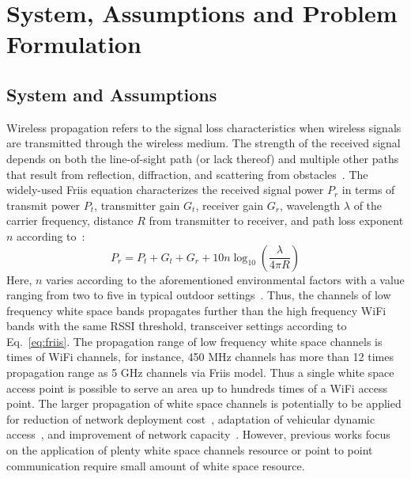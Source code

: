 \section{System, Assumptions and Problem Formulation}
\label{sec:problemformulation}

\subsection{System and Assumptions}
\label{subsec:model}
Wireless propagation refers to the signal loss characteristics when wireless signals 
are transmitted through the wireless medium. The strength of the received signal depends on 
both the line-of-sight path (or lack thereof) and multiple other paths that result from reflection, 
diffraction, and scattering from obstacles~\cite{andersen1995propagation}. The widely-used Friis
equation characterizes the received signal power $P_r$ in terms of transmit power $P_t$, transmitter 
gain $G_t$, receiver gain $G_r$, wavelength $\lambda$ of the carrier frequency, distance $R$ from 
transmitter to receiver, and path loss exponent $n$ according to~\cite{friis}:
\begin{equation}
\label{eq:friis}
P_r=P_t+G_t+G_r+10n \log_{10}\left( \frac{\lambda}{4\pi R}\right)
\end{equation}
Here, $n$ varies according to the aforementioned environmental 
factors with a value ranging from two to five in typical outdoor 
settings~\cite{rappaport}.
Thus, the channels of low frequency white space bands propagates further than the high frequency WiFi 
bands with the same RSSI threshold, transceiver settings according to Eq.~\ref{eq:friis}. 
The propagation range of low frequency white space channels is times of WiFi channels, for instance, 
450 MHz channels has more than 12 times propagation range as 5 GHz channels via Friis model. Thus a 
single white space access point is possible to serve an area up to hundreds times of a WiFi access point. 
The larger propagation of white space channels is potentially to be applied for reduction of network deployment 
cost~\cite{pcuiwinmee}, adaptation of vehicular dynamic access~\cite{chen2011feasibility}, and improvement 
of network capacity~\cite{bahl2009white}.
However, previous works focus on the application of plenty white space channels resource or point to point 
communication require small amount of white space resource. 


